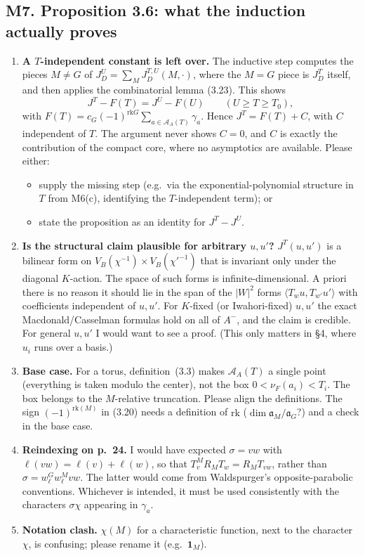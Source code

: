 \documentclass[11pt]{article}
\newcommand{\cA}{\mathcal{A}}
\newcommand{\fa}{\mathfrak{a}}
\newcommand{\ip}[1]{\langle #1\rangle}
\begin{document}
\subsection*{M7. Proposition 3.6: what the induction actually proves}
\begin{enumerate}[label=(\alph*)]
\item \textbf{A $T$-independent constant is left over.} The inductive step computes the pieces $M\neq G$ of $J^U_D=\sum_M J^{T,U}_D(M,\cdot)$, where the $M=G$ piece is $J^T_D$ itself, and then applies the combinatorial lemma (3.23). This shows
\[J^T-F(T)=J^U-F(U)\qquad(U\ge T\ge T_0),\]
with $F(T)=c_G(-1)^{\mathrm{rk}G}\sum_{a\in\cA_A(T)}\gamma_a$. Hence $J^T=F(T)+C$, with $C$ independent of $T$. The argument never shows $C=0$, and $C$ is exactly the contribution of the compact core, where no asymptotics are available. Please either:
\begin{itemize}
\item supply the missing step (e.g.\ via the exponential-polynomial structure in $T$ from M6(c), identifying the $T$-independent term); or
\item state the proposition as an identity for $J^T-J^U$.
\end{itemize}
\item \textbf{Is the structural claim plausible for arbitrary $u,u'$?} $J^T(u,u')$ is a bilinear form on $V_B(\chi^{-1})\times V_B(\chi'^{-1})$ that is invariant only under the diagonal $K$-action. The space of such forms is infinite-dimensional. A priori there is no reason it should lie in the span of the $|W|^2$ forms $\ip{T_wu,T_{w'}u'}$ with coefficients independent of $u,u'$. For $K$-fixed (or Iwahori-fixed) $u,u'$ the exact Macdonald/Casselman formulas hold on all of $A^-$, and the claim is credible. For general $u,u'$ I would want to see a proof. (This only matters in \S4, where $u_i$ runs over a basis.)
\item \textbf{Base case.} For a torus, definition~(3.3) makes $\cA_A(T)$ a single point (everything is taken modulo the center), not the box $0<\nu_F(a_i)<T_i$. The box belongs to the $M$-relative truncation. Please align the definitions. The sign $(-1)^{\mathrm{rk}(M)}$ in (3.20) needs a definition of $\mathrm{rk}$ ($\dim\fa_M/\fa_G$?) and a check in the base case.
\item \textbf{Reindexing on p.~24.} I would have expected $\sigma=vw$ with $\ell(vw)=\ell(v)+\ell(w)$, so that $T_v^M R_M T_w=R_MT_{vw}$, rather than $\sigma=w^G_\ell w^M_\ell vw$. The latter would come from Waldspurger's opposite-parabolic conventions. Whichever is intended, it must be used consistently with the characters $\sigma\chi$ appearing in $\gamma_a$.
\item \textbf{Notation clash.} $\chi(M)$ for a characteristic function, next to the character $\chi$, is confusing; please rename it (e.g.\ $\mathbf 1_M$).
\end{enumerate}
\end{document}
